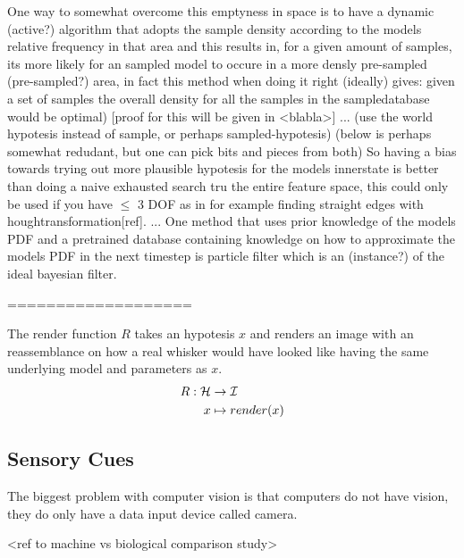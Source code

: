 One way to somewhat overcome this emptyness in space is to have a dynamic (active?) algorithm that adopts the sample density 
according to the models relative frequency in that area and this results in, for a given amount of samples, its more likely 
for an sampled model to occure in a more densly pre-sampled (pre-sampled?) area, in fact this method when doing it right (ideally) 
gives: given a set of samples the overall density for all the samples in the sampledatabase would be optimal) [proof for this will be given in <blabla>]
... (use the world hypotesis instead of sample, or perhaps sampled-hypotesis)
(below is perhaps somewhat redudant, but one can pick bits and pieces from both)
So having a bias towards trying out more plausible hypotesis for the models innerstate is better than 
doing a naive exhausted search tru the entire feature space, this could only be used if you have $\le$ 3 DOF as in for example finding straight edges with houghtransformation[ref].
...
One method that uses prior knowledge of the models PDF and a pretrained database containing knowledge on how to approximate the models PDF in the next timestep is particle filter which is an (instance?) of the ideal bayesian filter.



===================

\begin{definition}
    The render function $R$ takes an hypotesis $x$ and renders an image with an
    reassemblance on how a real whisker would have looked like having the same
    underlying model and parameters as $x$.
    \begin{equation}
        \begin{split}
            R : \mathcal{H} &\rightarrow \mathcal{I}\\
                x &\mapsto render(x)
        \end{split}
    \end{equation}
\end{definition}


\subsection{Sensory Cues}

The biggest problem with computer vision is that computers do not have
vision, they do only have a data input device called camera. 

<ref to machine vs biological comparison study>


